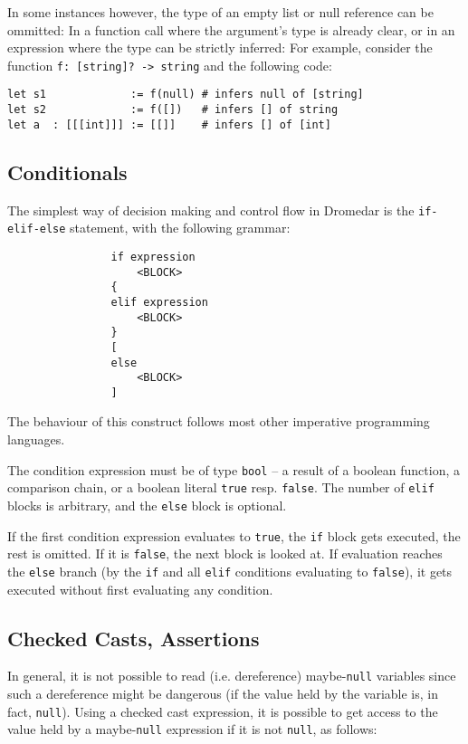\documentclass{article}
\newcommand{\code}[1]{\lstinline[columns=fixed]{#1}}
\begin{document}
				In some instances however, the type of an empty list or null reference can be ommitted: In a function call where the argument's type is already clear, or in an expression where the type can be strictly inferred: For example, consider the function \code{f: [string]? -> string} and the following code:
				
				\begin{lstlisting}
let s1             := f(null) # infers null of [string]
let s2             := f([])   # infers [] of string
let a  : [[[int]]] := [[]]    # infers [] of [int]
				\end{lstlisting}
		
		\subsection{Conditionals}
		
			The simplest way of decision making and control flow in Dromedar is the \code{if-elif-else} statement, with the following grammar:
			
			\begin{verbatim}
				if expression
				    <BLOCK>
				{
				elif expression
				    <BLOCK>
				}
				[
				else
				    <BLOCK>
				]
			\end{verbatim}
			
			The behaviour of this construct follows most other imperative programming languages.
			
			The condition expression must be of type \code{bool} -- a result of a boolean function, a comparison chain, or a boolean literal \code{true} resp. \code{false}. The number of \code{elif} blocks is arbitrary, and the \code{else} block is optional.
			
			If the first condition expression evaluates to \code{true}, the \code{if} block gets executed, the rest is omitted. If it is \code{false}, the next block is looked at. If evaluation reaches the \code{else} branch (by the \code{if} and all \code{elif} conditions evaluating to \code{false}), it gets executed without first evaluating any condition.
		
		\subsection{Checked Casts, Assertions}
		
			In general, it is not possible to read (i.e. dereference) maybe-\code{null} variables since such a dereference might be dangerous (if the value held by the variable is, in fact, \code{null}). Using a checked cast expression, it is possible to get access to the value held by a maybe-\code{null} expression if it is not \code{null}, as follows:
			
\end{document}
